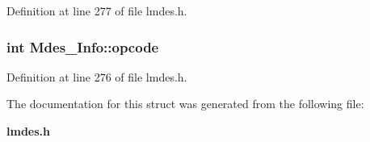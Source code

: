 Definition at line 277 of file lmdes.h.
\subsubsection{\setlength{\rightskip}{0pt plus 5cm}int \bf{Mdes\_\-Info::opcode}}\label{structMdes__Info_635a1f77a2a01516a8399444ceaf9fbe}




Definition at line 276 of file lmdes.h.

The documentation for this struct was generated from the following file:\begin{CompactItemize}
\item 
\bf{lmdes.h}\end{CompactItemize}
